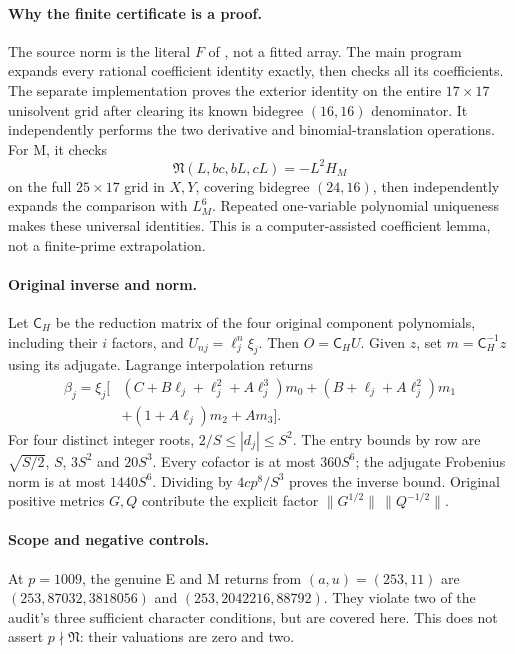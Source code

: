 \documentclass[11pt,reqno]{amsart}
\begin{document}
\paragraph{Why the finite certificate is a proof.}
The source norm is the literal $F$ of \cite[Track I, E1]{Frame}, not a fitted array.
The main program expands every rational coefficient identity exactly, then
checks all its coefficients. The separate implementation proves the exterior
identity on the entire $17\times17$ unisolvent grid after clearing its known
bidegree $(16,16)$ denominator. It independently performs the two derivative
and binomial-translation operations. For M, it checks
\[
 \mathfrak N(L,bc,bL,cL)=-L^2H_M
\]
on the full $25\times17$ grid in $X,Y$, covering bidegree $(24,16)$, then
independently expands the comparison with $L_M^6$. Repeated one-variable
polynomial uniqueness makes these universal identities. This is a
computer-assisted coefficient lemma, not a finite-prime extrapolation.

\paragraph{Original inverse and norm.}
Let $\mathsf C_H$ be the reduction matrix of the four original component
polynomials, including their $i$ factors, and $U_{nj}=\ell_j^n\xi_j$.
Then $O=\mathsf C_HU$. Given $z$, set $m=\mathsf C_H^{-1}z$ using its adjugate.
Lagrange interpolation returns
\begin{align*}
 \beta_j=\xi_j\bigl[&(C+B\ell_j+\ell_j^2+A\ell_j^3)m_0
 +(B+\ell_j+A\ell_j^2)m_1\\
 &+(1+A\ell_j)m_2+A m_3\bigr].
\end{align*}
For four distinct integer roots, $2/S\le|d_j|\le S^2$. The entry bounds by row are
$\sqrt{S/2}$, $S$, $3S^2$ and $20S^3$. Every cofactor is at most $360S^6$;
the adjugate Frobenius norm is at most $1440S^6$. Dividing by
$4cp^8/S^3$ proves the inverse bound. Original positive metrics $G,Q$
contribute the explicit factor $\|G^{1/2}\|\,\|Q^{-1/2}\|$.

\paragraph{Scope and negative controls.}
At $p=1009$, the genuine E and M returns from $(a,u)=(253,11)$ are
$(253,87032,3818056)$ and $(253,2042216,88792)$. They violate two of the audit's
three sufficient character conditions, but are covered here. This does not
assert $p\nmid\mathfrak N$: their valuations are zero and two.
\end{document}
